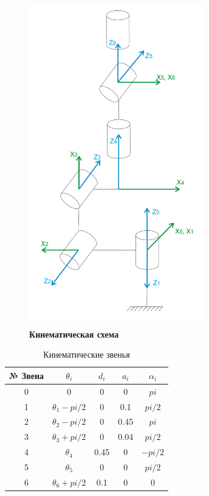 \documentclass[a4paper,14pt,russian]{extreport} \usepackage{extsizes}
\begin{document}
	\begin{figure}[h!]
		\centering		 
		\includegraphics[width=3in]{./img/img31.JPG}	
		\caption{
			\textbf{Кинематическая схема
			}     
		}
		\label{fig_img14}
	\end{figure}
	
	 \begin{table}[h!]
	 	\caption{Кинематические звенья} 
	 	\label{tab_kaw_klass}
	 	\centering
	 	\begin{tabular}{|c|c|c|c|c|}	
	 		
	 		\hline № Звена & $\theta_{i}$  & $d_{i}$ & 	$a_{i}$ & $\alpha_{i} $\\
	 		\hline	0 &  0                  & 0    & 0     & $pi$ \\
	 		\hline	1 &  $\theta_{1}-pi/2$  & 0    & 0.1   & $pi/2$ \\
	 		\hline	2 &  $\theta_{2}-pi/2$  & 0    & 0.45  & $pi $ \\
	 		\hline	3 &  $\theta_{3}+pi/2$  & 0    & 0.04  & $pi/2$  \\
	 		\hline	4 &  $\theta_{4}$       & 0.45 & 0     & $-pi/2 $  \\
	 		\hline	5 &  $\theta_{5}$       & 0    & 0     &$ pi/2$ \\ 
	 		\hline	6 &  $\theta_{6} +pi/2$ & 0.1  & 0      & 0  \\		
	 		\hline
	 	\end{tabular} 
	 \end{table}
	
\end{document}
